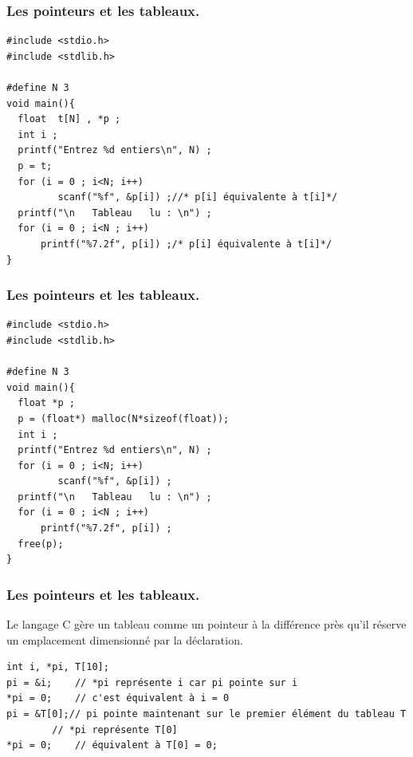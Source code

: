 \documentclass{beamer}
\begin{document}

\begin{frame}[fragile]
\frametitle{Les pointeurs et les tableaux.}	
\begin{verbatim}
#include <stdio.h>
#include <stdlib.h>

#define N 3
void main(){ 
  float  t[N] , *p ;
  int i ;
  printf("Entrez %d entiers\n", N) ;
  p = t;   
  for (i = 0 ; i<N; i++)
         scanf("%f", &p[i]) ;//* p[i] équivalente à t[i]*/
  printf("\n   Tableau   lu : \n") ;
  for (i = 0 ; i<N ; i++)
      printf("%7.2f", p[i]) ;/* p[i] équivalente à t[i]*/
}
\end{verbatim}

\end{frame}


\begin{frame}[fragile]
\frametitle{Les pointeurs et les tableaux.}	
\begin{verbatim}
#include <stdio.h>
#include <stdlib.h>

#define N 3
void main(){ 
  float *p ;
  p = (float*) malloc(N*sizeof(float));
  int i ;
  printf("Entrez %d entiers\n", N) ;
  for (i = 0 ; i<N; i++)
         scanf("%f", &p[i]) ;
  printf("\n   Tableau   lu : \n") ;
  for (i = 0 ; i<N ; i++)
      printf("%7.2f", p[i]) ;
  free(p);
}
\end{verbatim}

\end{frame}





\begin{frame}[fragile]
\frametitle{Les pointeurs et les tableaux.}
Le langage C gère un tableau comme un pointeur à la différence près qu'il réserve un emplacement dimensionné par la déclaration.

	
\begin{verbatim}
int i, *pi, T[10];
pi = &i;	// *pi représente i car pi pointe sur i
*pi = 0;	// c'est équivalent à i = 0
pi = &T[0];// pi pointe maintenant sur le premier élément du tableau T      
		// *pi représente T[0]
*pi = 0;	// équivalent à T[0] = 0;

\end{verbatim}

\end{frame}
\end{document}
